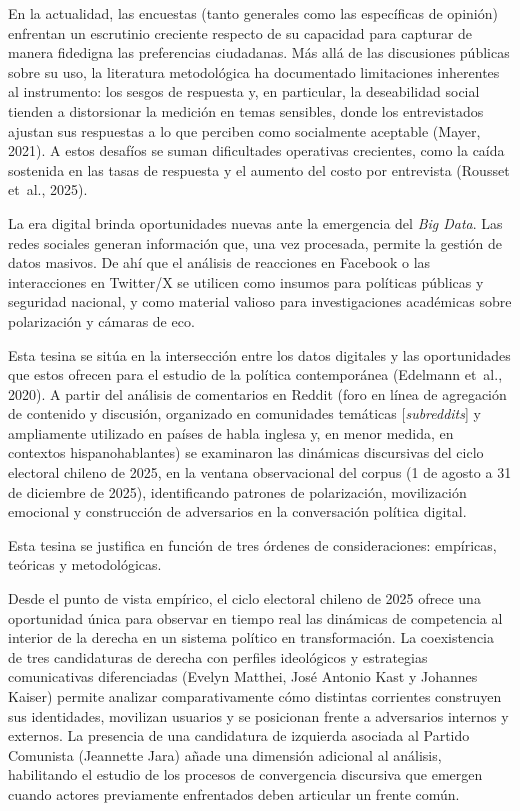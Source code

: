 \documentclass[
  letterpaper,
  numbers=noendperiod,
  fontsize=11pt,
  DIV=12,
  titlepage=false]{scrreprt}
\begin{document}
En la actualidad, las encuestas (tanto generales como las específicas de
opinión) enfrentan un escrutinio creciente respecto de su capacidad para
capturar de manera fidedigna las preferencias ciudadanas. Más allá de
las discusiones públicas sobre su uso, la literatura metodológica ha
documentado limitaciones inherentes al instrumento: los sesgos de
respuesta y, en particular, la deseabilidad social tienden a
distorsionar la medición en temas sensibles, donde los entrevistados
ajustan sus respuestas a lo que perciben como socialmente aceptable
(Mayer, 2021). A estos desafíos se suman dificultades operativas
crecientes, como la caída sostenida en las tasas de respuesta y el
aumento del costo por entrevista (Rousset et~al., 2025).

La era digital brinda oportunidades nuevas ante la emergencia del
\emph{Big Data}. Las redes sociales generan información que, una vez
procesada, permite la gestión de datos masivos. De ahí que el análisis
de reacciones en Facebook o las interacciones en Twitter/X se utilicen
como insumos para políticas públicas y seguridad nacional, y como
material valioso para investigaciones académicas sobre polarización y
cámaras de eco.

Esta tesina se sitúa en la intersección entre los datos digitales y las
oportunidades que estos ofrecen para el estudio de la política
contemporánea (Edelmann et~al., 2020). A partir del análisis de
comentarios en Reddit (foro en línea de agregación de contenido y
discusión, organizado en comunidades temáticas {[}\emph{subreddits}{]} y
ampliamente utilizado en países de habla inglesa y, en menor medida, en
contextos hispanohablantes) se examinaron las dinámicas discursivas del
ciclo electoral chileno de 2025, en la ventana observacional del corpus
(1 de agosto a 31 de diciembre de 2025), identificando patrones de
polarización, movilización emocional y construcción de adversarios en la
conversación política digital.

Esta tesina se justifica en función de tres órdenes de consideraciones:
empíricas, teóricas y metodológicas.

Desde el punto de vista empírico, el ciclo electoral chileno de 2025
ofrece una oportunidad única para observar en tiempo real las dinámicas
de competencia al interior de la derecha en un sistema político en
transformación. La coexistencia de tres candidaturas de derecha con
perfiles ideológicos y estrategias comunicativas diferenciadas (Evelyn
Matthei, José Antonio Kast y Johannes Kaiser) permite analizar
comparativamente cómo distintas corrientes construyen sus identidades,
movilizan usuarios y se posicionan frente a adversarios internos y
externos. La presencia de una candidatura de izquierda asociada al
Partido Comunista (Jeannette Jara) añade una dimensión adicional al
análisis, habilitando el estudio de los procesos de convergencia
discursiva que emergen cuando actores previamente enfrentados deben
articular un frente común.
\end{document}
